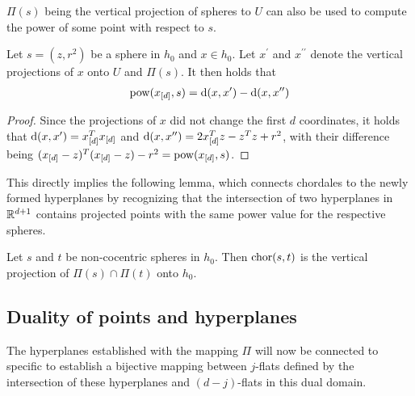 $\Pi(s)$ being the vertical projection of spheres to $U$ can also be used to compute the power of some point with respect to $s$.
\begin{observation}
    \label{obs:distances}
    Let $s = (z, r^2)$ be a sphere in $h_0$ and $x \in h_0$.
    Let $x^\prime$ and $x^{\prime\prime}$ denote the vertical projections of $x$ onto $U$ and $\Pi(s)$. It then holds that
    \begin{align}
        \operatorname{pow}(x_{[d]}, s) = \operatorname{d}(x, x^\prime) - \operatorname{d}(x, x^{\prime\prime})
    \end{align}
\end{observation}
\begin{proof}
    Since the projections of $x$ did not change the first $d$ coordinates, it holds that $\operatorname{d}(x, x^\prime) = x_{[d]}^Tx_{[d]}$ and $\operatorname{d}(x, x^{\prime\prime}) = 2x_{[d]}^Tz - z^Tz + r^2$, with their difference being $(x_{[d]} - z)^T(x_{[d]} - z) - r^2 = \operatorname{pow}(x_{[d]}, s)$.
\end{proof}

This directly implies the following lemma, which connects chordales to the newly formed hyperplanes by recognizing that the intersection of two hyperplanes in $\mathbb{R}^{d+1}$ contains projected points with the same power value for the respective spheres.

\begin{lemma}
    \label{lem:verticalprojection}
    Let $s$ and $t$ be non-cocentric spheres in $h_0$.
    Then $\operatorname{chor}(s, t)$ is the vertical projection of $\Pi(s) \cap \Pi(t)$ onto $h_0$.
\end{lemma}

\subsection{Duality of points and hyperplanes}
\label{sub:duality_of_points_and_hyperplanes}
The hyperplanes established with the mapping $\Pi$ will now be connected to specific  to establish a bijective mapping between $j$-flats defined by the intersection of these hyperplanes and $(d-j)$-flats in this dual domain.

